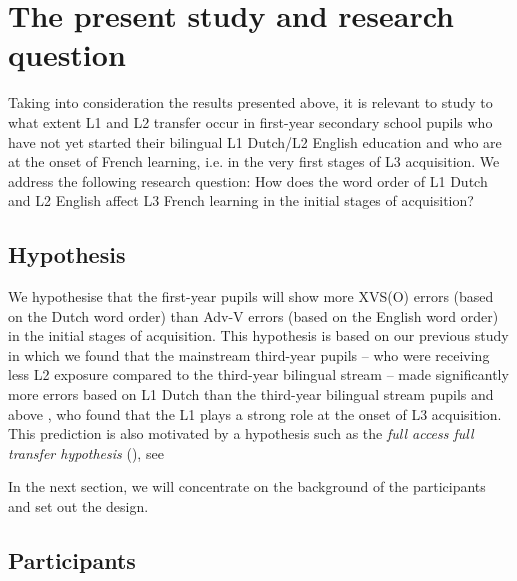 \documentclass[output=paper]{langsci/langscibook}
\begin{document}
\section{{The present study and research question}}%
\label{sec:stadt:3}

Taking into consideration the results presented above, it is relevant to study to what extent L1 and L2 transfer occur in first-year secondary school pupils who have not yet started their bilingual L1 Dutch/L2 English education and who are at the onset of French learning, i.e. in the very first stages of L3 acquisition. We address the following research question: How does the word order of L1 Dutch and L2 English affect L3 French learning in the initial stages of acquisition?

\subsection{Hypothesis}%
\label{sec:stadt:3.1}

We hypothesise that the first-year pupils will show more XVS(O) errors (based on the Dutch word order) than Adv-V errors (based on the English word order) in the initial stages of acquisition. This hypothesis is based on our previous study \citep{StadtEtAl2016} in which we found that the mainstream third-year pupils – who were receiving less L2 exposure compared to the third-year bilingual stream – made significantly more errors based on L1 Dutch than the third-year bilingual stream pupils and above \citep{Hermas2010, Hermas2014Morphosyntax, Hermas2014Relatives}, who found that the L1 plays a strong role at the onset of L3 acquisition. This prediction is also motivated by a hypothesis such as the \textit{full access full transfer hypothesis} (\citealt{SchwartzSprouse1996}), see 

In the next section, we will concentrate on the background of the participants and set out the design.

\subsection{{Participants}}
\label{sec:stadt:3.2}
\end{document}
